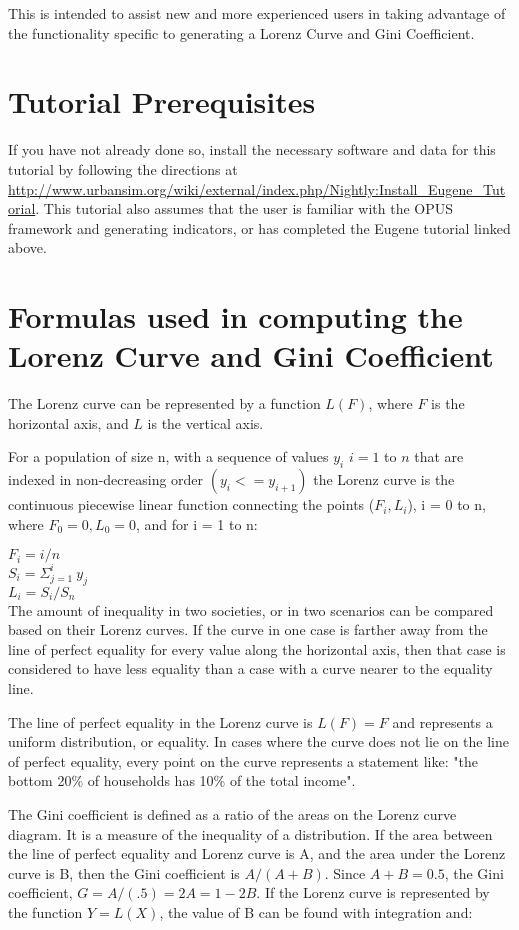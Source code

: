 \documentclass{howto}
\begin{document}
This is intended to assist new and more experienced users in taking
advantage of the functionality specific to generating a Lorenz Curve
and Gini Coefficient.

\section*{Tutorial Prerequisites}

If you have not already done so, install the necessary software and
data for this tutorial by following the directions at
\url{http://www.urbansim.org/wiki/external/index.php/Nightly:Install_Eugene_Tutorial}. 
This tutorial also assumes that the user is familiar with the OPUS framework and 
generating indicators, or has completed the Eugene tutorial 
linked above.

\section*{Formulas used in computing the Lorenz Curve and Gini Coefficient}

The Lorenz curve can be represented by a function $L(F)$, where $F$ is the horizontal axis, 
and $L$ is the vertical axis.

For a population of size n, with a sequence of values $y_{i}$ $i = 1$ to $n$ that are indexed in non-decreasing order $(y_{i} <= y_{i+1})$ the Lorenz curve is the continuous piecewise linear function connecting the points ($ F_i , L_i $), i = 0 to n, where $F_0 = 0, L_0 = 0$, and for i = 1 to n:

    $F_{i} = i/n $ \\
    $S_{i}= \Sigma_{j=1}^i\  y_{j}$ \\
    $L_{i} = S_i / S_n $ \\

The amount of inequality in two societies, or in two scenarios can be compared
based on their Lorenz curves.  If the curve in one case is farther away from
the line of perfect equality for every value along the horizontal axis, then
that case is considered to have less equality than a case with a curve nearer
to the equality line.

The line of perfect equality in the Lorenz curve is $L(F) = F$ and represents a uniform distribution, or equality.  
In cases where the curve does not lie on the line of perfect equality, every point on the curve represents a 
statement like: "the bottom 20\% of households has 10\% of the total income".


The Gini coefficient is defined as a ratio of the areas on the Lorenz curve diagram. 
It is a measure of the inequality of a distribution.  If the area between the line of 
perfect equality and Lorenz curve is A, and the area under the Lorenz curve is B, then the 
Gini coefficient is $A/(A+B)$. Since $A+B = 0.5$, the Gini coefficient, $G = A/(.5) = 2A = 1-2B$. 
If the Lorenz curve is represented by the function $Y = L(X)$, the value of B can be found with integration and:
\end{document}
